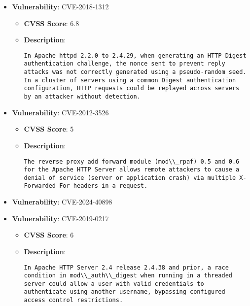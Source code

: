 \documentclass{article}
\begin{document}
\begin{itemize}
        \item \textbf{Vulnerability}: CVE-2018-1312
        \begin{itemize}
            \item \textbf{CVSS Score}:  6.8 
            \item \textbf{Description}:
            \parbox[t]{0.9\linewidth}{
                \verb|In Apache httpd 2.2.0 to 2.4.29, when generating an HTTP Digest authentication challenge, the nonce sent to prevent reply attacks was not correctly generated using a pseudo-random seed. In a cluster of servers using a common Digest authentication configuration, HTTP requests could be replayed across servers by an attacker without detection.|
            }
        \end{itemize}
    
        \item \textbf{Vulnerability}: CVE-2012-3526
        \begin{itemize}
            \item \textbf{CVSS Score}:  5 
            \item \textbf{Description}:
            \parbox[t]{0.9\linewidth}{
                \verb|The reverse proxy add forward module (mod\\_rpaf) 0.5 and 0.6 for the Apache HTTP Server allows remote attackers to cause a denial of service (server or application crash) via multiple X-Forwarded-For headers in a request.|
            }
        \end{itemize}
    
        \item \textbf{Vulnerability}: CVE-2024-40898
    
        \item \textbf{Vulnerability}: CVE-2019-0217
        \begin{itemize}
            \item \textbf{CVSS Score}:  6 
            \item \textbf{Description}:
            \parbox[t]{0.9\linewidth}{
                \verb|In Apache HTTP Server 2.4 release 2.4.38 and prior, a race condition in mod\\_auth\\_digest when running in a threaded server could allow a user with valid credentials to authenticate using another username, bypassing configured access control restrictions.|
            }
        \end{itemize}
    

\end{itemize}
\end{document}

